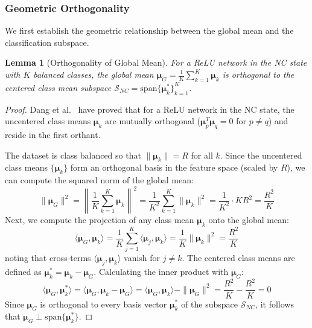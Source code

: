 \documentclass{article}
\theoremstyle{plain}
\newtheorem{lemma}[theorem]{Lemma}
\theoremstyle{definition}
\theoremstyle{remark}
\begin{document}
\subsubsection{Geometric Orthogonality}
We first establish the geometric relationship between the global mean and the classification subspace.
\begin{lemma}[Orthogonality of Global Mean]
\label{lemma:orthogonality}
For a ReLU network in the NC state with $K$ balanced classes,
the global mean $\bm{\mu}_G = \frac{1}{K}\sum_{k=1}^K \bm{\mu}_k$ is orthogonal to the centered class mean subspace $\mathcal{S}_{NC} = \text{span}\{\bm{\mu}_k^*\}_{k=1}^K$.
\end{lemma}

\begin{proof}
Dang et al.~\cite{dang2024} have proved that for a ReLU network in the NC state, 
the uncentered class means $\bm{\mu}_k$ are mutually orthogonal ($\bm{\mu}_p^T \bm{\mu}_q = 0$ for $p \neq q$) and reside in the first orthant. 

The dataset is class balanced so that $\|\bm{\mu}_k\| = R$ for all $k$.
Since the uncentered class means $\{\bm{\mu}_k\}$ form an orthogonal basis in the feature space (scaled by $R$), we can compute the squared norm of the global mean:
\begin{equation}
    \|\bm{\mu}_G\|^2 = \left\| \frac{1}{K} \sum_{k=1}^K \bm{\mu}_k \right\|^2 = \frac{1}{K^2} \sum_{k=1}^K \|\bm{\mu}_k\|^2 = \frac{1}{K^2} \cdot K R^2 = \frac{R^2}{K}
\end{equation}
Next, we compute the projection of any class mean $\bm{\mu}_k$ onto the global mean:
\begin{equation}
    \langle \bm{\mu}_G, \bm{\mu}_k \rangle = \frac{1}{K} \sum_{j=1}^K \langle \bm{\mu}_j, \bm{\mu}_k \rangle = \frac{1}{K} \|\bm{\mu}_k\|^2 = \frac{R^2}{K}
\end{equation}
noting that cross-terms $\langle \bm{\mu}_j, \bm{\mu}_k \rangle$ vanish for $j \neq k$.
The centered class means are defined as $\bm{\mu}_k^* = \bm{\mu}_k - \bm{\mu}_G$. Calculating the inner product with $\bm{\mu}_G$:
\begin{equation}
    \langle \bm{\mu}_G, \bm{\mu}_k^* \rangle = \langle \bm{\mu}_G, \bm{\mu}_k - \bm{\mu}_G \rangle = \langle \bm{\mu}_G, \bm{\mu}_k \rangle - \|\bm{\mu}_G\|^2 = \frac{R^2}{K} - \frac{R^2}{K} = 0
\end{equation}
Since $\bm{\mu}_G$ is orthogonal to every basis vector $\bm{\mu}_k^*$ of the subspace $\mathcal{S}_{NC}$, it follows that $\bm{\mu}_G \perp \text{span}\{\bm{\mu}_k^*\}$.
\end{proof}
\end{document}
